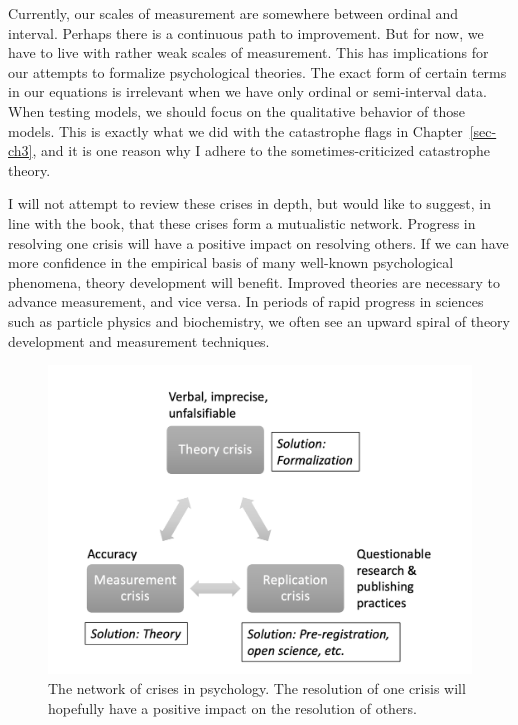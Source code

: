 \documentclass[
  a4paper,
  DIV=11,
  numbers=noendperiod]{scrreprt}
\begin{document}
Currently, our scales of measurement are somewhere between ordinal and
interval. Perhaps there is a continuous path to improvement. But for
now, we have to live with rather weak scales of measurement. This has
implications for our attempts to formalize psychological theories. The
exact form of certain terms in our equations is irrelevant when we have
only ordinal or semi-interval data. When testing models, we should focus
on the qualitative behavior of those models. This is exactly what we did
with the catastrophe flags in Chapter~\ref{sec-ch3}, and it is one
reason why I adhere to the sometimes-criticized catastrophe theory.

I will not attempt to review these crises in depth, but would like to
suggest, in line with the book, that these crises form a mutualistic
network. Progress in resolving one crisis will have a positive impact on
resolving others. If we can have more confidence in the empirical basis
of many well-known psychological phenomena, theory development will
benefit. Improved theories are necessary to advance measurement, and
vice versa. In periods of rapid progress in sciences such as particle
physics and biochemistry, we often see an upward spiral of theory
development and measurement techniques.

\begin{figure}

{\centering \includegraphics{media/ch8/ch8-fig1-extra.png}

}

\caption{The network of crises in psychology. The resolution of one
crisis will hopefully have a positive impact on the resolution of
others.}

\end{figure}
\end{document}
